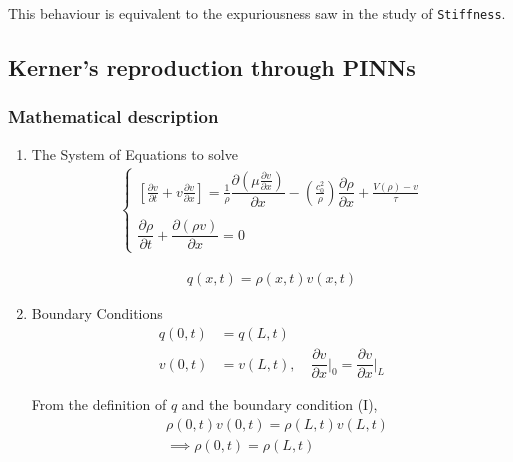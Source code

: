 \documentclass[11pt]{article}
\begin{document}
This behaviour is equivalent to the expuriousness saw in the study of
\texttt{Stiffness}.

\subsection{Kerner's reproduction through PINNs}
\label{sec:org659aded}
\subsubsection{Mathematical description}
\label{sec:org8e302ee}
\begin{enumerate}
\item The System of Equations to solve
\label{sec:org68f1b41}
\begin{equation}
\begin{aligned}
\begin{cases}
\label{eq:NS-n1}
\left[\frac{\partial{v}}{\partial{t}} + v\frac{\partial{v}}{\partial{x}} \right] = \frac{1}{\rho{}}\dfrac{\partial \left(\mu \frac{\partial{v}}{\partial{x}} \right)}{\partial{x}} - \left(\frac{c_0^2}{\rho{}}\right)\dfrac{\partial{\rho}}{\partial{x}} + \frac{V(\rho) - v}{\tau} \\\\
     \dfrac{\partial{\rho}}{\partial{t}} + \dfrac{\partial{\left( \rho{}v \right)}}{\partial{x}}=0
\end{cases}
   \end{aligned}
 \end{equation}

\begin{equation}
\begin{aligned}
q(x,t)=\rho(x,t)v(x,t)
\end{aligned}
\end{equation}

\item Boundary Conditions
\label{sec:orgc4e6b75}
\begin{equation}
\begin{aligned}
q(0,t) &= q(L,t)\\
v(0,t) &= v(L,t),\quad \dfrac{\partial{v}}{\partial{x}}\biggr\rvert_0 = \dfrac{\partial{v}}{\partial{x}}\biggr\rvert_L
\end{aligned}
\end{equation}

From the definition of \(q\) and the boundary condition (I),
\begin{equation}
\begin{aligned}
&\rho(0,t)v(0,t) = \rho(L,t)v(L,t) \\
&\implies \rho(0,t) = \rho(L,t)
\end{aligned}
\end{equation}
\end{enumerate}
\end{document}
